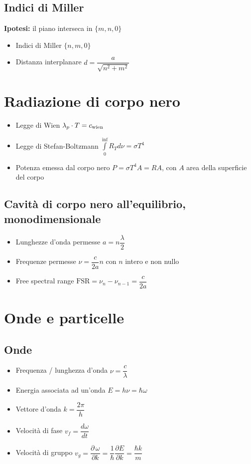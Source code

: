\documentclass{article}
\begin{document}
\subsection{Indici di Miller}
\textbf{Ipotesi:} il piano interseca in \( \{m, n, 0\} \)
\begin{itemize}
  \item Indici di Miller \( \{n, m, 0\} \)
  \item Distanza interplanare \( d = \dfrac{a}{\sqrt{n^2+m^2}} \)
\end{itemize}

\newpage

\section{Radiazione di corpo nero}
\begin{itemize}
  \item Legge di Wien \( \lambda_{p} \cdot T = c_{\textnormal{wien}} \)
  \item Legge di Stefan-Boltzmann \( \displaystyle \int\limits_{0}^{\inf} R_T d \nu = \sigma T ^ 4 \)
  \item Potenza emessa dal corpo nero \( P = \sigma T^4 A = R A \), con \(A\) area della superficie del corpo
\end{itemize}
\subsection{Cavità di corpo nero all'equilibrio, monodimensionale}
\begin{itemize}
  \item Lunghezze d'onda permesse \( a = n \dfrac{\lambda}{2} \)
  \item Frequenze permesse \( \nu = \dfrac{c}{2a} n \) con \( n \) intero e non nullo
  \item Free spectral range \( \text{FSR} = \nu_n - \nu_{n-1} = \dfrac{c}{2a} \)
\end{itemize}

\newpage

\section{Onde e particelle}
\subsection{Onde}
\begin{itemize}
  \item Frequenza / lunghezza d'onda \( \nu = \dfrac{c}{\lambda} \)
  \item Energia associata ad un'onda \( E = h \nu = \hbar \omega \)
  \item Vettore d'onda \( k = \dfrac{2 \pi}{h} \)
  \item Velocità di fase \( v_f = \dfrac{d \omega}{d t}\)
  \item Velocità di gruppo \( v_g = \dfrac{\partial \, \omega}{\partial k} = \dfrac{1}{\hbar} \dfrac{\partial E}{\partial k} =\dfrac{\hbar k}{m} \)
\end{itemize}
\end{document}
